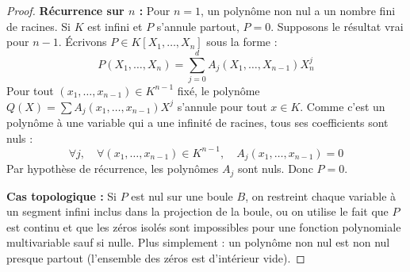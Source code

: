 \documentclass{prepacours}
\begin{document}
\begin{proof}
    \textbf{Récurrence sur $n$ :}
    Pour $n=1$, un polynôme non nul a un nombre fini de racines. Si $K$ est infini et $P$ s'annule partout, $P=0$.
    Supposons le résultat vrai pour $n-1$. Écrivons $P \in K[X_1, \dots, X_n]$ sous la forme :
    \[ P(X_1, \dots, X_n) = \sum_{j=0}^d A_j(X_1, \dots, X_{n-1}) X_n^j \]
    Pour tout $(x_1, \dots, x_{n-1}) \in K^{n-1}$ fixé, le polynôme $Q(X) = \sum A_j(x_1, \dots, x_{n-1}) X^j$ s'annule pour tout $x \in K$.
    Comme c'est un polynôme à une variable qui a une infinité de racines, tous ses coefficients sont nuls :
    \[ \forall j, \quad \forall (x_1, \dots, x_{n-1}) \in K^{n-1}, \quad A_j(x_1, \dots, x_{n-1}) = 0 \]
    Par hypothèse de récurrence, les polynômes $A_j$ sont nuls. Donc $P=0$.

    \textbf{Cas topologique :} Si $P$ est nul sur une boule $B$, on restreint chaque variable à un segment infini inclus dans la projection de la boule, ou on utilise le fait que $P$ est continu et que les zéros isolés sont impossibles pour une fonction polynomiale multivariable sauf si nulle. Plus simplement : un polynôme non nul est non nul presque partout (l'ensemble des zéros est d'intérieur vide).
\end{proof}
\end{document}
